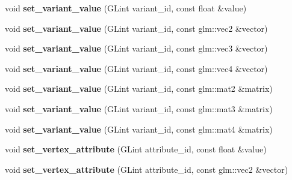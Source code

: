 \begin{DoxyCompactItemize}
void {\bfseries set\+\_\+variant\+\_\+value} (G\+Lint variant\+\_\+id, const float \&value)
\item 
\mbox{\label{classexample_1_1_shader___program_aafb8e263c3e0795f4db23ddee08da012}} 
void {\bfseries set\+\_\+variant\+\_\+value} (G\+Lint variant\+\_\+id, const glm\+::vec2 \&vector)
\item 
\mbox{\label{classexample_1_1_shader___program_ad8b23ef03d61adde52ecf72fbbd4a6ec}} 
void {\bfseries set\+\_\+variant\+\_\+value} (G\+Lint variant\+\_\+id, const glm\+::vec3 \&vector)
\item 
\mbox{\label{classexample_1_1_shader___program_a00688c6c2c7d831503c99e69f67f3288}} 
void {\bfseries set\+\_\+variant\+\_\+value} (G\+Lint variant\+\_\+id, const glm\+::vec4 \&vector)
\item 
\mbox{\label{classexample_1_1_shader___program_a93a22aa6829ff0be7c532acb7fd05694}} 
void {\bfseries set\+\_\+variant\+\_\+value} (G\+Lint variant\+\_\+id, const glm\+::mat2 \&matrix)
\item 
\mbox{\label{classexample_1_1_shader___program_aca12e7c6d741e66bdfca344fc7ba1bd1}} 
void {\bfseries set\+\_\+variant\+\_\+value} (G\+Lint variant\+\_\+id, const glm\+::mat3 \&matrix)
\item 
\mbox{\label{classexample_1_1_shader___program_a289700aa2fe5bd795cc1fa119e1beece}} 
void {\bfseries set\+\_\+variant\+\_\+value} (G\+Lint variant\+\_\+id, const glm\+::mat4 \&matrix)
\item 
\mbox{\label{classexample_1_1_shader___program_a3f3c9e0b56278a38b467a50a8e52d396}} 
void {\bfseries set\+\_\+vertex\+\_\+attribute} (G\+Lint attribute\+\_\+id, const float \&value)
\item 
\mbox{\label{classexample_1_1_shader___program_ad0308ff685cf521c86e50b68464403d1}} 
void {\bfseries set\+\_\+vertex\+\_\+attribute} (G\+Lint attribute\+\_\+id, const glm\+::vec2 \&vector)
\item 

\end{DoxyCompactItemize}
